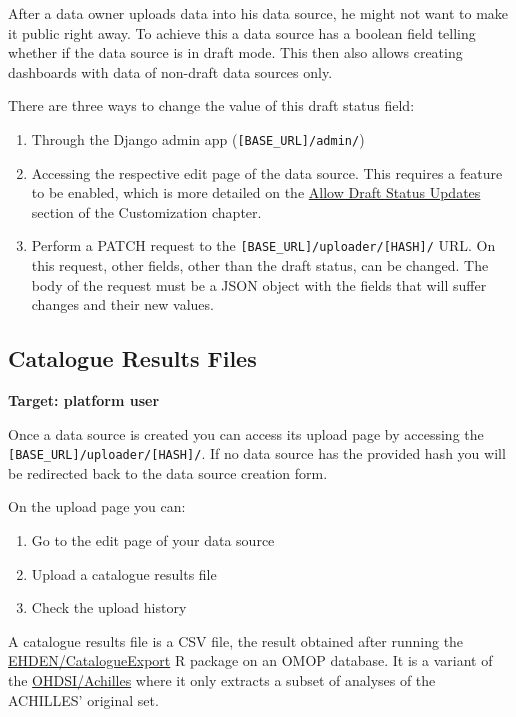 \documentclass[
]{book}
\providecommand{\tightlist}{%
  \setlength{\itemsep}{0pt}\setlength{\parskip}{0pt}}
\begin{document}
After a data owner uploads data into his data source, he might not want to make it public right away.
To achieve this a data source has a boolean field telling whether if the data source is in draft mode.
This then also allows creating dashboards with data of non-draft data sources only.

There are three ways to change the value of this draft status field:

\begin{enumerate}
\def\labelenumi{\arabic{enumi}.}
\tightlist
\item
  Through the Django admin app (\texttt{{[}BASE\_URL{]}/admin/})
\item
  Accessing the respective edit page of the data source. This requires a feature to be enabled, which is more detailed on the \href{customizations.html\#allow-draft-status-updates}{Allow Draft Status Updates} section of the Customization chapter.
\item
  Perform a PATCH request to the \texttt{{[}BASE\_URL{]}/uploader/{[}HASH{]}/} URL. On this request, other fields, other than the draft status, can be changed. The body of the request must be a JSON object with the fields that will suffer changes and their new values.
\end{enumerate}

\hypertarget{catalogue-results-files}{%
\subsection*{Catalogue Results Files}\label{catalogue-results-files}}

\textbf{Target: platform user}

Once a data source is created you can access its upload page by accessing the \texttt{{[}BASE\_URL{]}/uploader/{[}HASH{]}/}. If no data source has the provided hash you will be redirected back to the data source creation form.

On the upload page you can:

\begin{enumerate}
\def\labelenumi{\arabic{enumi}.}
\tightlist
\item
  Go to the edit page of your data source
\item
  Upload a catalogue results file
\item
  Check the upload history
\end{enumerate}

A catalogue results file is a CSV file, the result obtained after running the \href{https://github.com/EHDEN/CatalogueExport}{EHDEN/CatalogueExport} R package on an OMOP database. It is a variant of the \href{https://github.com/OHDSI/Achilles}{OHDSI/Achilles} where it only extracts a subset of analyses of the ACHILLES' original set.
\end{document}

